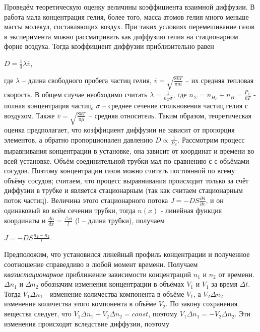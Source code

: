 \documentclass[a4paper, 12pt]{article}
\begin{document}
\begin{center}
Проведём теоретическую оценку величины коэффициента взаимной диффузии. В работа мала концентрация гелия, более того, масса атомов гелия много меньше массы молекул, составляющих воздух. При таких условиях перемешивание газов в эксперимента можно рассматривать как диффузию гелия на стационарном форне воздуха. Тогда коэффициент диффузии приблизительно равен
\begin{center}
$\displaystyle D = \frac{1}{3}\lambda \bar v$,
\end{center}
где $\lambda$ -- длина свободного пробега частиц гелия, $\displaystyle \bar v = \sqrt{\frac{8kT}{\pi m}}$ -- их средняя тепловая скорость. В общем случае необходимо считать $\displaystyle \lambda = \frac{1}{n_\Sigma \sigma}$, где $\displaystyle n_\Sigma = n_H_e + n_B = \frac{P_\Sigma}{kT}$ - полная концентрация частиц, $\sigma$ -- среднее сечение столкновения частиц гелия с воздухом. Также  $\displaystyle \bar v = \sqrt{\frac{8kT}{\pi \mu}}$ -- средняя относитель. Таким образом, теоретическая оценка предполагает, что коэффициент диффузии не зависит от пропорция элементов, а обратно пропорционален давлению $\displaystyle D \propto \frac{1}{P_\Sigma}$.
Рассмотрим процесс выравнивания концентрации в установке, она зависит от координат и времени во всей установке. Объём соединительной трубки мал по сравнению с с объёмами сосудов. Поэтому концентрации газов можно считать постоянной по всему объёму сосудов; считаем, что процесс выравнивания происходит только за счёт диффузии в трубке и является стационарным (так как считаем стационарным поток частиц). Величина этого стационарного потока $\displaystyle J = -DS\frac{\partial n}{\partial x}$, и он одинаковый во всём сечении трубки, тогда $n(x)$ - линейная функция координаты и $\displaystyle \frac{dn}{dx} = \frac{\triangle n}{l}$ (l -- длина трубки), получаем 
\begin{center}
$\displaystyle J = -DS \frac{n_1-n_2}{l}$.
\end{center}
Предположим, что установился линейный профиль концентрации и полученное соотношение справедливо в любой момент времени. Получаем {\sl квазистационарное} приближение зависимости концентраций $n_1$ и $n_2$ от времени.
 $\Delta n_1$ и $\Delta n_2$ обозначим изменения концентрации в объёмах $V_1$ и $V_1$ за время $\Delta t$. Тогда $V_1 \Delta n_1$ - изменение количества компонента в объёме $V_1$, а $V_2 \Delta n_2$ - изменение количества этого компонента в объёме $V_2$. По закону сохранения вещества следует, что $V_1 \Delta n_1 + V_2 \Delta n_2 = const$, поэтому $V_1 \Delta n_1 = - V_2 \Delta n_2$. Эти изменения происходят вследствие диффузии, поэтому 

\end{center}
\end{document}
